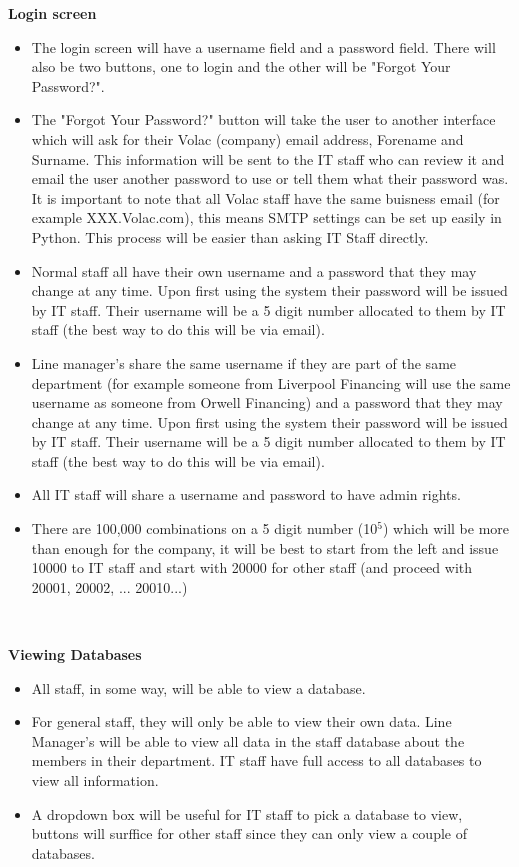 \textbf{Login screen}
\begin{itemize}
\item The login screen will have a username field and a password field. There will also be two buttons, one to login and the other will be "Forgot Your Password?".
\item The "Forgot Your Password?" button will take the user to another interface which will ask for their Volac (company) email address, Forename and Surname. This information will be sent to the IT staff who can review it and email the user another password to use or tell them what their password was. It is important to note that all Volac staff have the same buisness email (for example XXX.Volac.com), this means SMTP settings can be set up easily in Python. This process will be easier than asking IT Staff directly.
\item Normal staff all have their own username and a password that they may change at any time. Upon first using the system their password will be issued by IT staff. Their username will be a 5 digit number allocated to them by IT staff (the best way to do this will be via email). 
\item Line manager's share the same username if they are part of the same department (for example someone from Liverpool Financing will use the same username as someone from Orwell Financing) and a password that they may change at any time. Upon first using the system their password will be issued by IT staff. Their username will be a 5 digit number allocated to them by IT staff (the best way to do this will be via email). 
\item All IT staff will share a username and password to have admin rights.
\item There are 100,000 combinations on a 5 digit number (10$^5$) which will be more than enough for the company, it will be best to start from the left and issue 10000 to IT staff and start with 20000 for other staff (and proceed with 20001, 20002, ... 20010...)
\end{itemize}

\

\textbf{Viewing Databases}

\begin{itemize}
\item All staff, in some way, will be able to view a database.
\item For general staff, they will only be able to view their own data. Line Manager's will be able to view all data in the staff database about the members in their department. IT staff have full access to all databases to view all information.
\item A dropdown box will be useful for IT staff to pick a database to view, buttons will surffice for other staff since they can only view a couple of databases.
\end{itemize}

